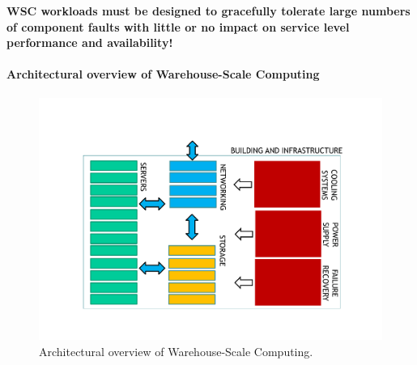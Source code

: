 \highspace
\textbf{WSC workloads must be designed to gracefully tolerate large numbers of component faults with little or no impact on service level performance and availability!}

\hfill

\longline

\hfill

\paragraph{Architectural overview of Warehouse-Scale Computing}

\begin{figure}[!htp]
    \centering
    \includegraphics[width=\textwidth]{img/WSC-architecture-1.pdf}
    \caption{Architectural overview of Warehouse-Scale Computing.}
\end{figure}

\newpage

